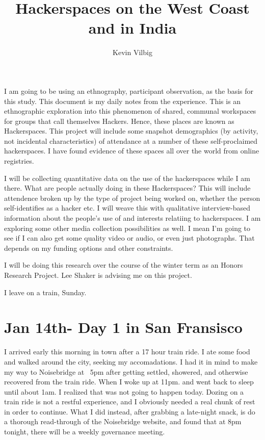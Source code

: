\documentclass[11pt]{amsart}
\begin{document}
\title{Hackerspaces on the West Coast and in India}
\author{Kevin Vilbig}
\maketitle

I am going to be using an ethnography, participant observation, as the basis for this study. This document is my daily notes from the experience. This is an ethnographic exploration into this phenomenon of shared, communal workspaces for groups that call themselves Hackers. Hence, these places are known as Hackerspaces. This project will include some snapshot demographics (by activity, not incidental characteristics) of attendance at a number of these self-proclaimed hackerspaces. I have found evidence of these spaces all over the world from online registries.

I will be collecting quantitative data on the use of the hackerspaces while I am there. What are people actually doing in these Hackerspaces? This will include attendence broken up by the type of project being worked on, whether the person self-identifies as a hacker etc. I will weave this with qualitative interview-based information about the people's use of and interests relatiing to hackerspaces. I am exploring some other media collection possibilities as well. I mean I’m going to see if I can also get some quality video or audio, or even just photographs. That depends on my funding options and other constraints.

I will be doing this research over the course of the winter term as an Honors Research Project. Lee Shaker is advising me on this project.

I leave on a train, Sunday.

\section{Jan 14th- Day 1 in San Fransisco}

I arrived early this morning in town after a 17 hour train ride. I ate some food and walked around the city, seeking my accomadations. I had it in mind to make my way to Noisebridge at ~5pm after getting settled, showered, and otherwise recovered from the train ride. When I woke up at 11pm. and went back to sleep until about 1am. I realized that was not going to happen today. Dozing on a train ride is not a restful experience, and I obviously needed a real chunk of rest in order to continue. What I did instead, after grabbing a late-night snack,  is do a thorough read-through of the Noisebridge website, and found that at 8pm tonight, there will be a weekly governance meeting.
\end{document}
